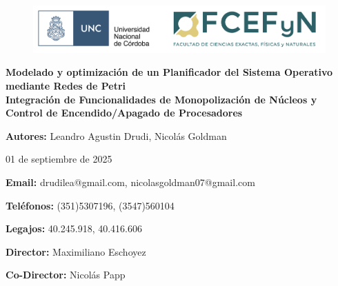 \begin{titlepage}
    \begin{center}
        \vspace*{1cm}

        \begin{figure}
            \centering
            \begin{minipage}[t]{\textwidth}\centering
                \includegraphics[width=1\textwidth]{./images/color_UNC-FCEFyN.png}
            \end{minipage}\hfill
        \end{figure}

        \huge
        \textbf{Modelado y optimización de un Planificador del Sistema Operativo mediante Redes de Petri} \\

        \vspace{.5cm}
        \large
        \textbf{Integración de Funcionalidades de Monopolización de Núcleos y Control de Encendido/Apagado de Procesadores} \\

        \vspace{2cm}

        \Large
        \textbf{Autores:} Leandro Agustin Drudi, Nicolás Goldman

        \vspace{.5cm}

        \large
        01 de septiembre de 2025

        \vspace{1.5cm}

        \normalsize
        \textbf{Email:} drudilea@gmail.com, nicolasgoldman07@gmail.com

        \vspace{.5cm}

        \textbf{Teléfonos:} (351)5307196, (3547)560104

        \vspace{.5cm}

        \textbf{Legajos:} 40.245.918, 40.416.606

        \vspace{1.5cm}

        \textbf{Director:} Maximiliano Eschoyez

        \vspace{.5cm}

        \textbf{Co-Director:} Nicolás Papp

        \vspace{1cm}


        \vspace{0.5cm}

        \vfill

    \end{center}
\end{titlepage}